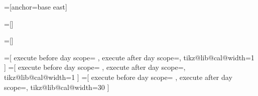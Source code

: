 
=[anchor=base east]

=[]

=[]

\def\tikzdaycode{\node[name=\pgfcalendarsuggestedname,every day]{\tikzdaytext};}
\def\tikzmonthcode{\node[every month]{\tikzmonthtext};}
\def\tikzyearcode{\node[every year]{\tikzyeartext};}

\def\tikzdaytext{\%d-}
\def\tikzmonthtext{\%mt}
\def\tikzyeartext{\%y0}




\def\tikz@lib@cal@width{1}

%
%

=[%
  execute before day scope={
  },  
  execute after day scope={\pgfmathsetlength{\pgf@y}{\tikz@lib@cal@yshift}\pgftransformyshift{-\pgf@y}},
  tikz@lib@cal@width=1
]
=[%
  execute before day scope={
  },  
  execute after day scope={\pgftransformyshift\tikz@lib@cal@yshift},
  tikz@lib@cal@width=1
]
=[%
  execute before day scope={
  },  
  execute after day scope={\pgftransformxshift\tikz@lib@cal@xshift},
  tikz@lib@cal@width=30%
]

